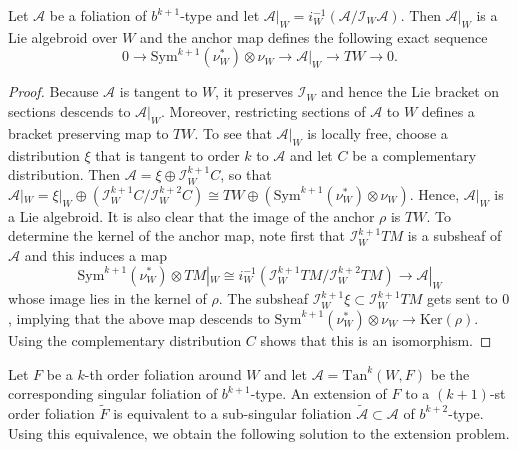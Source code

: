 \documentclass[10pt]{amsart}
\numberwithin{theoremalpha}{section}
\numberwithin{equation}{section}
\numberwithin{definition}{section}
\numberwithin{theorem}{section}
\numberwithin{proposition}{section}
\numberwithin{lemma}{section}
\numberwithin{example}{section}
\numberwithin{remark}{section}
\numberwithin{corollary}{section}
\numberwithin{question}{section}
\numberwithin{problem}{section}
\numberwithin{assumption}{section}
\theoremstyle{named}
\numberwithin{equation}{section}
\begin{document}
\begin{proposition} \label{restrictedLiealgebroid}
Let $\mathcal{A}$ be a foliation of $b^{k+1}$-type and let $\mathcal{A}|_{W} = i_{W}^{-1}(\mathcal{A}/\mathcal{I}_{W} \mathcal{A})$. Then $\mathcal{A}|_{W} $ is a Lie algebroid over $W$ and the anchor map defines the following exact sequence 
\begin{equation} \label{restrictedanchorsequence}
0 \to \mathrm{Sym}^{k+1}(\nu_{W}^*) \otimes \nu_{W} \to \mathcal{A}|_{W}  \to TW \to 0. 
\end{equation}
\end{proposition}
\begin{proof}
Because $\mathcal{A}$ is tangent to $W$, it preserves $\mathcal{I}_W$ and hence the Lie bracket on sections descends to $\mathcal{A}|_{W}$. Moreover, restricting sections of $\mathcal{A}$ to $W$ defines a bracket preserving map to $TW$. To see that $\mathcal{A}|_{W}$ is locally free, choose a distribution $\xi$ that is tangent to order $k$ to $\mathcal{A}$ and let $C$ be a complementary distribution. Then $\mathcal{A} = \xi \oplus \mathcal{I}_W^{k+1}C$, so that $\mathcal{A}|_{W} = \xi|_{W} \oplus (\mathcal{I}_W^{k+1}C/\mathcal{I}_W^{k+2}C) \cong TW \oplus (\mathrm{Sym}^{k+1}(\nu_{W}^*) \otimes \nu_{W})$. Hence, $\mathcal{A}|_{W}$ is a Lie algebroid. It is also clear that the image of the anchor $\rho$ is $TW$. To determine the kernel of the anchor map, note first that $\mathcal{I}_W^{k+1} TM$ is a subsheaf of $\mathcal{A}$ and this induces a map 
\[
\mathrm{Sym}^{k+1}(\nu_{W}^*) \otimes TM|_{W} \cong i^{-1}_{W}(\mathcal{I}_W^{k+1} TM/ \mathcal{I}_W^{k+2} TM) \to \mathcal{A}|_{W}
\]
whose image lies in the kernel of $\rho$. The subsheaf $\mathcal{I}_W^{k+1} \xi \subset \mathcal{I}_W^{k+1} TM$ gets sent to $0$, implying that the above map descends to $\mathrm{Sym}^{k+1}(\nu_{W}^*) \otimes \nu_{W} \to \mathrm{Ker}(\rho)$. Using the complementary distribution $C$ shows that this is an isomorphism.  
\end{proof}

Let $F$ be a $k$-th order foliation around $W$ and let $\mathcal{A} = \mathrm{Tan}^{k}(W,F)$ be the corresponding singular foliation of $b^{k+1}$-type. An extension of $F$ to a $(k+1)$-st order foliation $\tilde{F}$ is equivalent to a sub-singular foliation $\tilde{\mathcal{A}} \subset \mathcal{A}$ of $b^{k+2}$-type. Using this equivalence, we obtain the following solution to the extension problem. 
\end{document}
